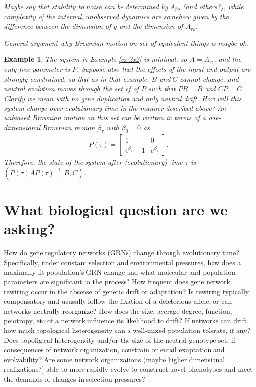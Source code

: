 \documentclass[11 pt]{article}
\newcommand{\plr}[1]{{\color{blue}\it #1}}
\newcommand{\ro}{{ro}}
\newcommand{\nro}{{\bar{r}o}}
\newtheorem{example}{Example}
\begin{document}
\plr{Maybe say that stability to noise can be determined by $A_\nro$ (and others?),
while complexity of the internal, unobserved dynamics
are somehow given by the difference between the dimension of $y$ and the dimension of $A_\ro$.}

\plr{General argument why Brownian motion on set of equivalent things is maybe ok.}

\begin{example}
    The system in Example \ref{ex:2x2} is minimal, so $A=A_\ro$,
    and the only free parameter is $P$.
    Suppose also that the effects of the input and output are strongly constrained,
    so that as in that example,
    $B$ and $C$ cannot change,
    and neutral evolution moves through the set of of $P$ such that $PB=B$ and $CP=C$.
    \plr{Clarify we mean with no gene duplication and only neutral drift.}
    How will this system change over evolutionary time in the manner described \plr{above}?
    An unbiased Brownian motion on this set 
    can be written in terms of a one-dimensional Brownian motion $\beta_\tau$ 
    with $\beta_0=0$ as
    \begin{align*}
        P(\tau) = \left[
            \begin{array}{cc}
                1 & 0 \\
                e^{\beta_\tau}-1 & e^{\beta_\tau}
            \end{array}
            \right] .
    \end{align*}
    Therefore, the state of the system after (evolutionary) time $\tau$
    is $(P(\tau)AP(\tau)^{-1},B,C)$.
\end{example}


\section{What biological question are we asking?}

How do gene regulatory networks (GRNs) change through evolutionary time?
Specifically, under constant selection and environmental pressures, how does a
maximally fit population's GRN change and what molecular and population
parameters are significant to the process? How frequent does gene network
rewiring occur in the absense of genetic drift or adaptation? Is rewiring
typically compensatory and ususally follow the fixation of a deleterious
allele, or can networks neutrally reorganize? How does the size, average
degree, function, peiotropy, etc of a network influence its likelihood to
drift? If networks can drift, how much topological heterogeneity can a
well-mixed population tolerate, if any? Does topoligical heterogeneity and/or
the size of the neutral genotype-set, if consequences of network organization,
constrain or entail exaptation and evolvability? Are some network organizations
(maybe higher dimensional realizations?) able to more rapidly evolve to
construct novel phenotypes and meet the demands of changes in selection
pressures?
\end{document}
